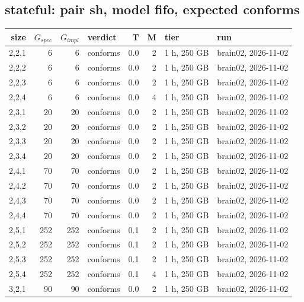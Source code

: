 \documentclass[10pt]{article}
\begin{document}
\subsection*{stateful: pair \textsf{sh}, model fifo, expected conforms}
\begin{longtable}{@{}rrrlrrll@{}}
\toprule
size & $G_{\mathit{spec}}$ & $G_{\mathit{impl}}$ & verdict & T & M & tier & run \\
\midrule
\endhead
\color{blue} 2,2,1 & 6 & 6 & conforms & 0.0 & 2 & 1 h, 250 GB & brain02, 2026-11-02 \\
\color{blue} 2,2,2 & 6 & 6 & conforms & 0.0 & 2 & 1 h, 250 GB & brain02, 2026-11-02 \\
\color{blue} 2,2,3 & 6 & 6 & conforms & 0.0 & 2 & 1 h, 250 GB & brain02, 2026-11-02 \\
\color{blue} 2,2,4 & 6 & 6 & conforms & 0.0 & 4 & 1 h, 250 GB & brain02, 2026-11-02 \\
\color{blue} 2,3,1 & 20 & 20 & conforms & 0.0 & 2 & 1 h, 250 GB & brain02, 2026-11-02 \\
\color{blue} 2,3,2 & 20 & 20 & conforms & 0.0 & 2 & 1 h, 250 GB & brain02, 2026-11-02 \\
\color{blue} 2,3,3 & 20 & 20 & conforms & 0.0 & 2 & 1 h, 250 GB & brain02, 2026-11-02 \\
\color{blue} 2,3,4 & 20 & 20 & conforms & 0.0 & 2 & 1 h, 250 GB & brain02, 2026-11-02 \\
\color{blue} 2,4,1 & 70 & 70 & conforms & 0.0 & 2 & 1 h, 250 GB & brain02, 2026-11-02 \\
\color{blue} 2,4,2 & 70 & 70 & conforms & 0.0 & 2 & 1 h, 250 GB & brain02, 2026-11-02 \\
\color{blue} 2,4,3 & 70 & 70 & conforms & 0.0 & 2 & 1 h, 250 GB & brain02, 2026-11-02 \\
\color{blue} 2,4,4 & 70 & 70 & conforms & 0.0 & 2 & 1 h, 250 GB & brain02, 2026-11-02 \\
\color{blue} 2,5,1 & 252 & 252 & conforms & 0.1 & 2 & 1 h, 250 GB & brain02, 2026-11-02 \\
\color{blue} 2,5,2 & 252 & 252 & conforms & 0.1 & 2 & 1 h, 250 GB & brain02, 2026-11-02 \\
\color{blue} 2,5,3 & 252 & 252 & conforms & 0.1 & 2 & 1 h, 250 GB & brain02, 2026-11-02 \\
\color{blue} 2,5,4 & 252 & 252 & conforms & 0.1 & 4 & 1 h, 250 GB & brain02, 2026-11-02 \\
\color{blue} 3,2,1 & 90 & 90 & conforms & 0.0 & 2 & 1 h, 250 GB & brain02, 2026-11-02 \\

\end{longtable}
\end{document}
